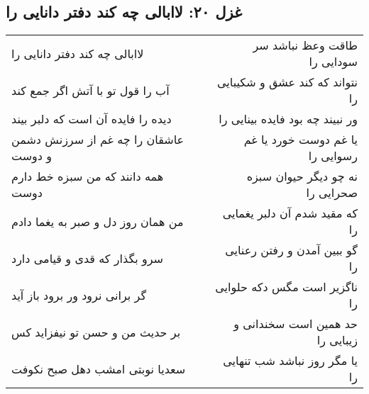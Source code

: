 \begin{center}
\section*{غزل ۲۰: لاابالی چه کند دفتر دانایی را}
\label{sec:020}
\begin{longtable}{l p{0.5cm} r}
لاابالی چه کند دفتر دانایی را
&&
طاقت وعظ نباشد سر سودایی را
\\
آب را قول تو با آتش اگر جمع کند
&&
نتواند که کند عشق و شکیبایی را
\\
دیده را فایده آن است که دلبر بیند
&&
ور نبیند چه بود فایده بینایی را
\\
عاشقان را چه غم از سرزنش دشمن و دوست
&&
یا غم دوست خورد یا غم رسوایی را
\\
همه دانند که من سبزه خط دارم دوست
&&
نه چو دیگر حیوان سبزه صحرایی را
\\
من همان روز دل و صبر به یغما دادم
&&
که مقید شدم آن دلبر یغمایی را
\\
سرو بگذار که قدی و قیامی دارد
&&
گو ببین آمدن و رفتن رعنایی را
\\
گر برانی نرود ور برود باز آید
&&
ناگزیر است مگس دکه حلوایی را
\\
بر حدیث من و حسن تو نیفزاید کس
&&
حد همین است سخندانی و زیبایی را
\\
سعدیا نوبتی امشب دهل صبح نکوفت
&&
یا مگر روز نباشد شب تنهایی را
\\
\end{longtable}
\end{center}
